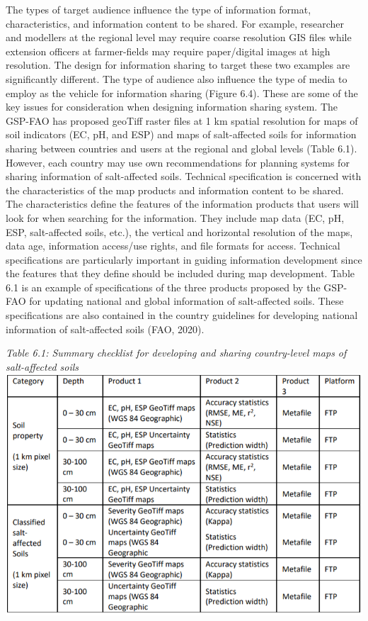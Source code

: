 \documentclass[
  10pt,
  b5paper,
]{book}
\begin{document}
The types of target audience influence the type of information format, characteristics, and information content to be shared. For example, researcher and modellers at the regional level may require coarse resolution GIS files while extension officers at farmer-fields may require paper/digital images at high resolution. The design for information sharing to target these two examples are significantly different. The type of audience also influence the type of media to employ as the vehicle for information sharing (Figure 6.4). These are some of the key issues for consideration when designing information sharing system. The GSP-FAO has proposed geoTiff raster files at 1 km spatial resolution for maps of soil indicators (EC, pH, and ESP) and maps of salt-affected soils for information sharing between countries and users at the regional and global levels (Table 6.1). However, each country may use own recommendations for planning systems for sharing information of salt-affected soils.
Technical specification is concerned with the characteristics of the map products and information content to be shared. The characteristics define the features of the information products that users will look for when searching for the information. They include map data (EC, pH, ESP, salt-affected soils, etc.), the vertical and horizontal resolution of the maps, data age, information access/use rights, and file formats for access. Technical specifications are particularly important in guiding information development since the features that they define should be included during map development. Table 6.1 is an example of specifications of the three products proposed by the GSP-FAO for updating national and global information of salt-affected soils. These specifications are also contained in the country guidelines for developing national information of salt-affected soils (FAO, 2020).

\emph{Table 6.1: Summary checklist for developing and sharing country-level maps of salt-affected soils}
\includegraphics{figures/tables/Table_6.1.png}
\end{document}

